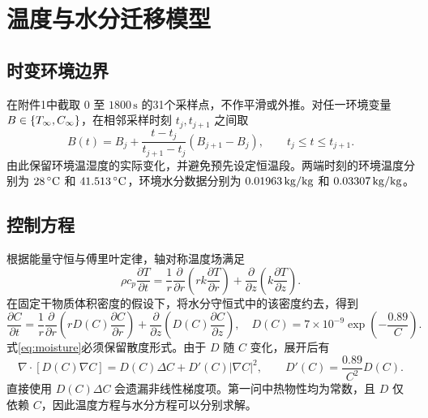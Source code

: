 \clearpage
\section{温度与水分迁移模型}

\subsection{时变环境边界}
在附件1中截取 $0$ 至 $1800\,\mathrm{s}$ 的31个采样点，不作平滑或外推。对任一环境变量 $B\in\{\Tin,C_\infty\}$，在相邻采样时刻 $t_j,t_{j+1}$ 之间取
\begin{equation}
 B(t)=B_j+\frac{t-t_j}{t_{j+1}-t_j}(B_{j+1}-B_j),\qquad t_j\le t\le t_{j+1}.
 \label{eq:ambient}
\end{equation}
由此保留环境温湿度的实际变化，并避免预先设定恒温段。两端时刻的环境温度分别为 $28\,\celsius$ 和 $41.513\,\celsius$，环境水分数据分别为 $0.01963\,\kgkg$ 和 $0.03307\,\kgkg$。

\subsection{控制方程}
根据能量守恒与傅里叶定律，轴对称温度场满足
\begin{equation}
 \rho c_p\frac{\partial T}{\partial t}
 =\frac{1}{r}\frac{\partial}{\partial r}\left(rk\frac{\partial T}{\partial r}\right)
  +\frac{\partial}{\partial z}\left(k\frac{\partial T}{\partial z}\right).
 \label{eq:heat}
\end{equation}
在固定干物质体积密度的假设下，将水分守恒式中的该密度约去，得到
\begin{equation}
 \frac{\partial C}{\partial t}
 =\frac{1}{r}\frac{\partial}{\partial r}\left(rD(C)\frac{\partial C}{\partial r}\right)
  +\frac{\partial}{\partial z}\left(D(C)\frac{\partial C}{\partial z}\right),\quad
 D(C)=7\times10^{-9}\exp\left(-\frac{0.89}{C}\right).
 \label{eq:moisture}
\end{equation}
式\eqref{eq:moisture}必须保留散度形式。由于 $D$ 随 $C$ 变化，展开后有
\begin{equation}
 \nabla\!\cdot[D(C)\nabla C]
 =D(C)\Delta C+D'(C)|\nabla C|^2,\qquad
 D'(C)=\frac{0.89}{C^2}D(C).
 \label{eq:nonlinear}
\end{equation}
直接使用 $D(C)\Delta C$ 会遗漏非线性梯度项。第一问中热物性均为常数，且 $D$ 仅依赖 $C$，因此温度方程与水分方程可以分别求解。

